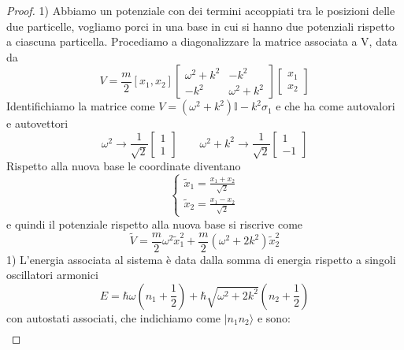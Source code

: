 \begin{proof}
	1) Abbiamo un potenziale con dei termini accoppiati tra le posizioni delle due particelle, vogliamo porci in una base in cui si hanno due potenziali rispetto a ciascuna particella. Procediamo a diagonalizzare la matrice associata a V, data da 
	\begin{equation*}
		V = \frac{m}{2}[x_1,x_2] \left[\begin{array}{cc}
			\omega^2+k^2 & -k^2 \\ -k^2 & \omega^2 + k^2
		\end{array} \right] \left[ \begin{array}{l}
			x_1 \\ x_2
		\end{array}\right]
	\end{equation*}
\newpage 
Identifichiamo la matrice come $V = (\omega^2 + k^2) \mathbb{I} -k^2 \sigma_1$ e che ha come autovalori e autovettori
\begin{equation*}
	\omega^2 \to \frac{1}{\sqrt{2}}\left[\begin{array}{l}
		1 \\1
	\end{array}\right] \quad \quad  \omega^2+k^2 \to \frac{1}{\sqrt{2}}\left[\begin{array}{l}
		1 \\ -1
	\end{array}\right]
\end{equation*}
Rispetto alla nuova base le coordinate diventano 
\begin{equation*}
	\left \{ \begin{array}{l}
	\tilde{x}_1 = \frac{x_1 + x_2}{\sqrt{2}} \\[0.3cm]
	\tilde{x}_2 = \frac{x_1-x_2}{\sqrt{2}}
	\end{array}\right.
\end{equation*}
e quindi il potenziale rispetto alla nuova base si riscrive come
\begin{equation*}
	\tilde{V} = \frac{m}{2}\omega^2\tilde{x}_1^2 + \frac{m}{2}(\omega^2+2k^2)\tilde{x}_2^2
\end{equation*}
1) L'energia associata al sistema \`e data dalla somma di energia rispetto a singoli oscillatori armonici
\begin{equation*}
	E = \hbar \omega \left(n_1 + \frac{1}{2}\right) + \hbar \sqrt{\omega^2 + 2k^2}\left(n_2 + \frac{1}{2}\right)
\end{equation*}
con autostati associati, che indichiamo come $|n_1 n_2 \rangle$ e sono:
\begin{align*}

\end{align*}
\end{proof}
